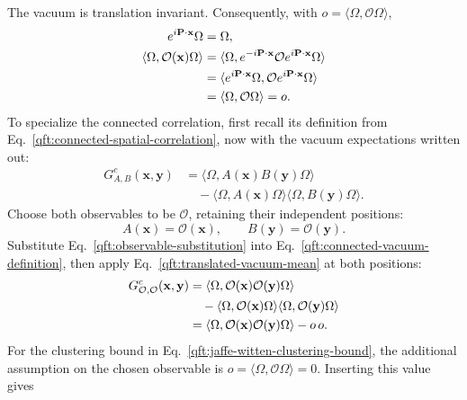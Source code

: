 The vacuum is translation invariant. Consequently, with
$o=\langle\Omega,\mathcal O\Omega\rangle$,
\begin{align}
 e^{i\mathbf P\cdot\mathbf x}\Omega&=\Omega,\notag\\
 \langle\Omega,\mathcal O(\mathbf x)\Omega\rangle
 &=\langle\Omega,e^{-i\mathbf P\cdot\mathbf x}
        \mathcal O e^{i\mathbf P\cdot\mathbf x}\Omega\rangle\notag\\
 &=\langle e^{i\mathbf P\cdot\mathbf x}\Omega,
         \mathcal O e^{i\mathbf P\cdot\mathbf x}\Omega\rangle\notag\\
 &=\langle\Omega,\mathcal O\Omega\rangle=o.
 \label{qft:translated-vacuum-mean}
\end{align}
To specialize the connected correlation, first recall its definition
from Eq.~\eqref{qft:connected-spatial-correlation}, now with the vacuum
expectations written out:
\begin{equation}\label{qft:connected-vacuum-definition}
 \begin{split}
 G^c_{A,B}(\mathbf x,\mathbf y)
 &=\langle\Omega,A(\mathbf x)B(\mathbf y)\Omega\rangle\\
 &\quad-\langle\Omega,A(\mathbf x)\Omega\rangle
          \langle\Omega,B(\mathbf y)\Omega\rangle.
 \end{split}
\end{equation}
Choose both observables to be $\mathcal O$, retaining their independent
positions:
\begin{equation}\label{qft:observable-substitution}
 A(\mathbf x)=\mathcal O(\mathbf x),\qquad
 B(\mathbf y)=\mathcal O(\mathbf y).
\end{equation}
Substitute Eq.~\eqref{qft:observable-substitution} into
Eq.~\eqref{qft:connected-vacuum-definition}, then apply
Eq.~\eqref{qft:translated-vacuum-mean} at both positions:
\begin{align}
 G^c_{\mathcal O,\mathcal O}(\mathbf x,\mathbf y)
 &=\langle\Omega,\mathcal O(\mathbf x)\mathcal O(\mathbf y)\Omega\rangle
   \notag\\
 &\quad-\langle\Omega,\mathcal O(\mathbf x)\Omega\rangle
          \langle\Omega,\mathcal O(\mathbf y)\Omega\rangle\notag\\
 &=\langle\Omega,\mathcal O(\mathbf x)\mathcal O(\mathbf y)\Omega\rangle
     -o\,o.
 \label{qft:identical-observable-connected}
\end{align}
For the clustering bound in Eq.~\eqref{qft:jaffe-witten-clustering-bound},
the additional assumption on the chosen observable is
$o=\langle\Omega,\mathcal O\Omega\rangle=0$. Inserting this value gives
